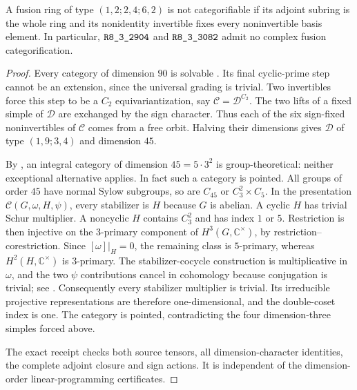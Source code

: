 \begin{theorem}\label{thm:m3-dimension90}
A fusion ring of type $(1,2;2,4;6,2)$ is not categorifiable if its adjoint
subring is the whole ring and its nonidentity invertible fixes every
noninvertible basis element. In particular, $\sha{R8_3_2904}$ and
$\sha{R8_3_3082}$ admit no complex fusion categorification.
\end{theorem}
\begin{proof}
Every category of dimension $90$ is solvable
\cite[Corollary~4.16]{DongWeak}. Its final cyclic-prime step
\cite[Proposition~4.4]{ENOSolvable} cannot be an extension, since the
universal grading is trivial. Two invertibles force this step to be a
$C_2$ equivariantization, say $\mathcal C=\mathcal D^{C_2}$.
The two lifts of a fixed simple of $\mathcal D$ are exchanged by the
sign character. Thus each of the six sign-fixed noninvertibles of
$\mathcal C$ comes from a free orbit. Halving their dimensions gives
$\mathcal D$ of type $(1,9;3,4)$ and dimension $45$.

By \cite[Theorem~1.1]{JordanLarson}, an integral category of dimension
$45=5\cdot3^2$ is group-theoretical: neither exceptional alternative
applies. In fact such a category is pointed. All groups of order $45$
have normal Sylow subgroups, so are $C_{45}$ or $C_3^2\times C_5$.
In the presentation $\mathcal C(G,\omega,H,\psi)$, every stabilizer
is $H$ because $G$ is abelian. A cyclic $H$ has trivial Schur multiplier.
A noncyclic $H$ contains $C_3^2$ and has index $1$ or $5$. Restriction is then
injective on the $3$-primary component of $H^3(G,\mathbb C^\times)$,
by restriction--corestriction. Since $[\omega]|_H=0$, the remaining
class is $5$-primary, whereas $H^2(H,\mathbb C^\times)$ is $3$-primary.
The stabilizer-cocycle construction is multiplicative in $\omega$,
and the two $\psi$ contributions cancel in cohomology because
conjugation is trivial; see \cite[Section~5.1]{GelakiNaidu}.
Consequently every stabilizer multiplier is trivial. Its irreducible
projective representations are therefore one-dimensional, and the
double-coset index is one. The category is pointed, contradicting
the four dimension-three simples forced above.

The exact receipt checks both source tensors, all dimension-character
identities, the complete adjoint closure and sign actions. It is
independent of the dimension-order linear-programming certificates.
\end{proof}
